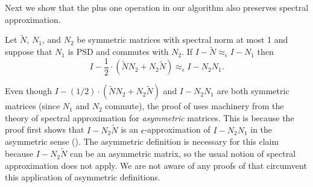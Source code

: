 \documentclass{toc}
\newcommand{\wt}{\widetilde}   %
\numberwithin{myalgctr}{section}
\theoremstyle{named}
\begin{document}
Next we show that the plus one operation in our algorithm also preserves spectral approximation.

\begin{lemma}
\label{lem:plusapprox}
Let $\wt{N}$, $N_1$, and $N_2$ be symmetric matrices with spectral norm at most 1 and suppose that $N_1$ is PSD and commutes with $N_2$. If $I-\wt{N}\approx_{\epsilon} I-N_1$ then 
\[
I-\frac{1}{2}\cdot (\wt{N}N_2 + N_2\wt{N})\approx_{\epsilon} I-N_2N_1.
\]
\end{lemma}

Even though $I-(1/2)\cdot (\wt{N}N_2 + N_2\wt{N})$ and $I-N_2N_1$ are both symmetric matrices (since $N_1$ and $N_2$ commute), the proof of  uses machinery from the theory of spectral approximation for \emph{asymmetric} matrices. This is because the proof first shows that $I-N_2\wt{N}$ is an $\epsilon$-approximation of $I-N_2N_1$ in the asymmetric sense (). The asymmetric definition is necessary for this claim because $I-N_2\wt{N}$ can be an asymmetric matrix, so the usual notion of spectral approximation does not apply. We are not aware of any proofs of  that circumvent this application of asymmetric definitions. 
\end{document}
